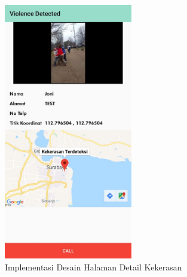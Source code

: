 \begin{figure} [!ht]
  \centering
  \includegraphics[width=0.5\textwidth]{gambar/detail.jpeg}
  \caption{Implementasi Desain Halaman Detail Kekerasan}
  \label{fig:detail_impl}
\end{figure}